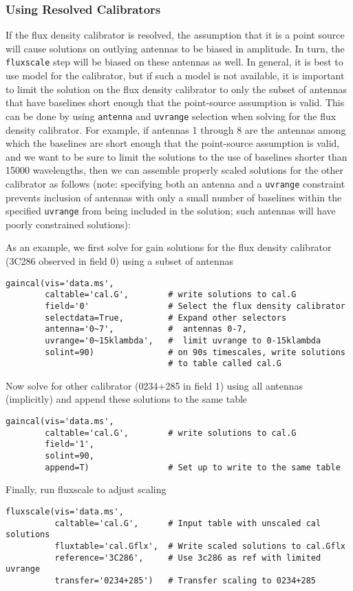 {%
\subsubsection{Using Resolved Calibrators}
\label{section:cal.solve.fluxscale.resolved}

If the flux density calibrator is resolved, the assumption that it is
a point source will cause solutions on outlying antennas to be biased
in amplitude.  In turn, the {\tt fluxscale} step will be biased
on these antennas as well.  In general, it is best to use 
model for the calibrator, but if such a model is not available,
it is important to limit the solution on the flux density calibrator
to only the subset of antennas that have baselines short enough that
the point-source assumption is valid.  This can be done by using
{\tt antenna} and {\tt uvrange} selection when solving for the flux density
calibrator.  For example, if antennas 1 through 8 are the antennas
among which the baselines are short enough that the point-source
assumption is valid, and we want to be sure to limit the solutions to
the use of baselines shorter than 15000 wavelengths, then we can
assemble properly scaled solutions for the other calibrator as follows
(note: specifying both an antenna and a {\tt uvrange} constraint prevents
inclusion of antennas with only a small number of baselines within the
specified {\tt uvrange} from being included in the solution; such antennas
will have poorly constrained solutions):

As an example, we first solve for gain solutions for the flux density
calibrator (3C286 observed in field 0) using a subset of antennas
\small
\begin{verbatim}
gaincal(vis='data.ms',
        caltable='cal.G',        # write solutions to cal.G
        field='0'                # Select the flux density calibrator
        selectdata=True,         # Expand other selectors
        antenna='0~7',           #  antennas 0-7,
        uvrange='0~15klambda',   #  limit uvrange to 0-15klambda
        solint=90)               # on 90s timescales, write solutions
                                 # to table called cal.G
\end{verbatim}
\normalsize
Now solve for other calibrator (0234+285 in field 1) using all antennas
(implicitly) and append these solutions to the same table
\small
\begin{verbatim}
gaincal(vis='data.ms',
        caltable='cal.G',        # write solutions to cal.G
        field='1',
        solint=90,
        append=T)                # Set up to write to the same table
\end{verbatim}
\normalsize
Finally, run fluxscale to adjust scaling
\small
\begin{verbatim}
fluxscale(vis='data.ms',
          caltable='cal.G',      # Input table with unscaled cal solutions
          fluxtable='cal.Gflx',  # Write scaled solutions to cal.Gflx
          reference='3C286',     # Use 3c286 as ref with limited uvrange
          transfer='0234+285')   # Transfer scaling to 0234+285
\end{verbatim}
\normalsize

}

